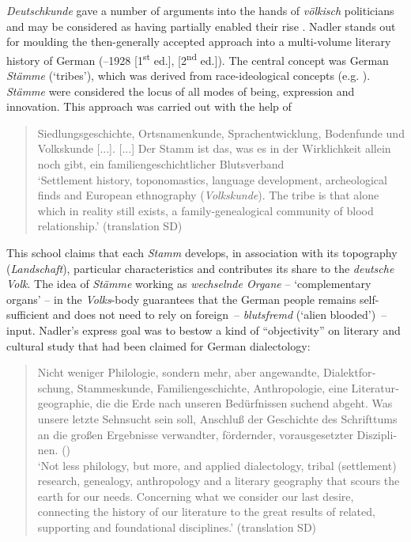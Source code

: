 \documentclass[output=paper]{langscibook}
\begin{document}
\textit{Deutschkunde} gave a number of arguments into the hands of \textit{völkisch} politicians and may be considered as having partially enabled their rise \citep[2--3]{Hutton1999}. Nadler stands out for moulding the then-generally accepted approach into a multi-volume literary history of German (\citealt{Nadler1912}--1928 [1\textsuperscript{st} ed.], \citealt{Nadler1938} [2\textsuperscript{nd} ed.]). The central concept was German \textit{Stämme} (`tribes'), which was derived from race-ideological concepts (e.g. \citealt{Nadler1934}). \textit{Stämme} were considered the locus of all modes of being, expression and innovation. This approach was carried out with the help of

\begin{quote}
\foreignlanguage{ngerman}{%
Siedlungsgeschichte, Ortsnamenkunde, Sprachentwicklung, Bodenfunde und Volkskunde [...]. [...] Der Stamm ist das, was es in der Wirklichkeit allein noch gibt, ein familiengeschichtlicher Blutsverband \citep[7--8]{Nadler1934}
}\medskip\\
`Settlement history, toponomastics, language development, archeological finds and European ethnography (\textit{Volkskunde}). The tribe is that alone which in reality still exists, a family-genealogical community of blood relationship.' (translation SD)
\end{quote}

This school claims that each \textit{Stamm} develops, in association with its topography (\textit{Landschaft}), particular characteristics and contributes its share to the \textit{deutsche Volk}. The idea of \textit{Stämme} working as \textit{wechselnde Organe} – `complementary organs' – in the \textit{Volks}-body guarantees that the German people remains self-sufficient and does not need to rely on foreign~– \textit{blutsfremd} (`alien blooded')~– input. Nadler’s express goal was to bestow a kind of ``objectivity” on literary and cultural study that had been claimed for German dialectology:

\begin{quote}
\foreignlanguage{ngerman}{%
Nicht weniger Philologie, sondern mehr, aber angewandte, Dialektforschung, Stammeskunde, Familiengeschichte, Anthropologie, eine Literaturgeographie, die die Erde nach unseren Bedürfnissen suchend abgeht. Was unsere letzte Sehnsucht sein soll, Anschluß der Geschichte des Schrifttums an die großen Ergebnisse verwandter, fördernder, vorausgesetzter Disziplinen. (\citealt[Band 1: vii--viii]{Nadler1912})}\medskip\\
`Not less philology, but more, and applied dialectology, tribal (settlement) research, genealogy, anthropology and a literary geography that scours the earth for our needs. Concerning what we consider our last desire, connecting the history of our literature to the great results of related, supporting and foundational disciplines.' (translation SD)
\end{quote}
\end{document}
